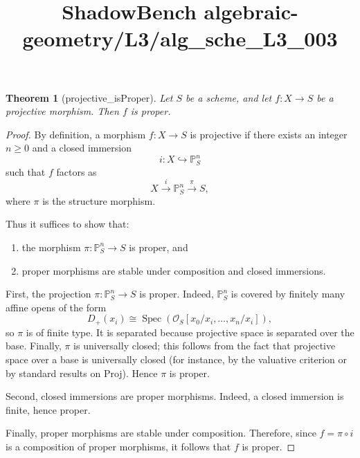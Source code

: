 \documentclass{article}
\title{ShadowBench algebraic-geometry/L3/alg\_sche\_L3\_003}
\newtheorem{theorem}{Theorem}
\begin{document}
\maketitle

\begin{theorem}[projective_isProper]
Let $S$ be a scheme, and let $f : X \to S$ be a projective morphism. Then $f$ is proper.
\end{theorem}

\begin{proof}
By definition, a morphism $f : X \to S$ is projective if there exists an integer $n \ge 0$ and a closed immersion
\[
i : X \hookrightarrow \mathbb{P}^n_S
\]
such that $f$ factors as
\[
X \xrightarrow{i} \mathbb{P}^n_S \xrightarrow{\pi} S,
\]
where $\pi$ is the structure morphism.

Thus it suffices to show that:
\begin{enumerate}
\item the morphism $\pi : \mathbb{P}^n_S \to S$ is proper, and
\item proper morphisms are stable under composition and closed immersions.
\end{enumerate}

First, the projection $\pi : \mathbb{P}^n_S \to S$ is proper. Indeed, $\mathbb{P}^n_S$ is covered by finitely many affine opens of the form
\[
D_+(x_i) \cong \operatorname{Spec}(\mathcal{O}_S[x_0/x_i,\dots,x_n/x_i]),
\]
so $\pi$ is of finite type. It is separated because projective space is separated over the base. Finally, $\pi$ is universally closed; this follows from the fact that projective space over a base is universally closed (for instance, by the valuative criterion or by standard results on Proj). Hence $\pi$ is proper.

Second, closed immersions are proper morphisms. Indeed, a closed immersion is finite, hence proper.

Finally, proper morphisms are stable under composition. Therefore, since $f = \pi \circ i$ is a composition of proper morphisms, it follows that $f$ is proper.
\end{proof}
\end{document}
